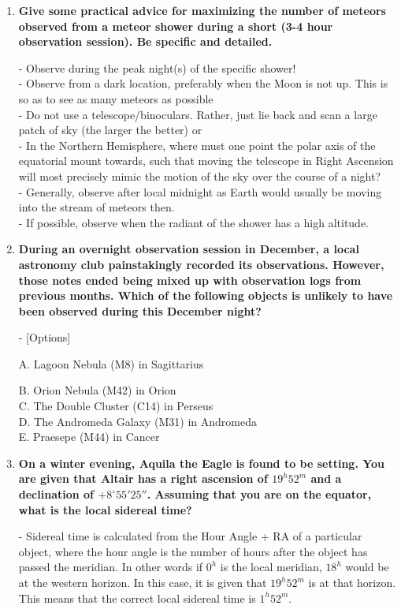 \documentclass[a4paper,12pt]{extarticle}
\begin{document}
\begin{enumerate}
\clearpage
	\item \textbf{Give some practical advice for maximizing the number of meteors observed from a meteor shower during a short (3-4 hour observation session). Be specific and detailed.}
	
	\begin{sol}
		- Observe during the peak night(s) of the specific shower!\\
		- Observe from a dark location, preferably when the Moon is not up. This is so as to see as many meteors as possible\\
		- Do not use a telescope/binoculars. Rather, just lie back and scan a large patch of sky (the larger the better) or\\
		- In the Northern Hemisphere, where must one point the polar axis of the equatorial mount towards, such that moving the telescope in Right Ascension will most precisely mimic the motion of the sky over the course of a night?\\ 
		- Generally, observe after local midnight as Earth would usually be moving into the stream of meteors then.\\
		- If possible, observe when the radiant of the shower has a high altitude.
	\end{sol}
	
	\item \textbf{During an overnight observation session in December, a local astronomy club painstakingly recorded its observations. However, those notes ended being mixed up with observation logs from previous months. Which of the following objects is unlikely to have been observed during this December night?}

- [Options] 
\begin{sol}
	A. {\color{red} Lagoon Nebula (M8) in Sagittarius} \quad [$\surd$]
\end{sol}
B. Orion Nebula (M42) in Orion\\
C. The Double Cluster (C14) in Perseus\\
D. The Andromeda Galaxy (M31) in Andromeda\\
E. Praesepe (M44) in Cancer
	
\item \textbf{On a winter evening, Aquila the Eagle is found to be setting. You are given that Altair has a right ascension of $19^h52^m$ and a declination of $+8^\circ55'25''$. Assuming that you are on the equator, what is the local sidereal time?}
\begin{sol}
- Sidereal time is calculated from the Hour Angle + RA of a particular object, where the hour angle is the number of hours after the object has passed the meridian. In other words if $0^h$ is the local meridian, $18^h$ would be at the western horizon. In this case, it is given that $19^h52^m$ is at that horizon. This means that the correct local sidereal time is $1^h52^m$. 	
\end{sol}


\end{enumerate}
\end{document}
